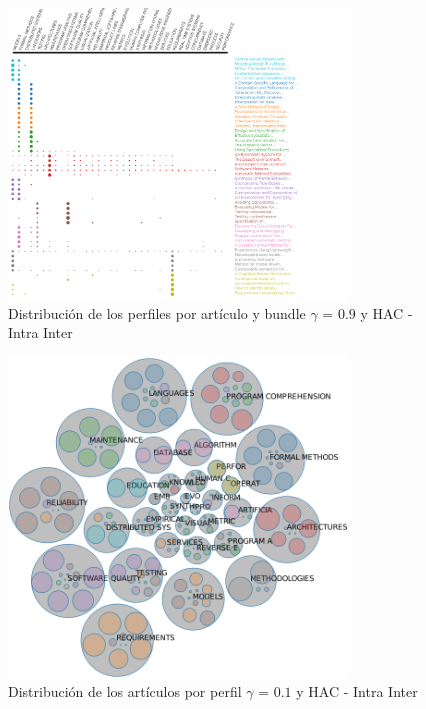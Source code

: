 \begin{figure}[H]
  \centering
    \includegraphics[width=0.8\textwidth]{resultados/papers/HAC/INTRA_INTER/gamma-09.png}
  \caption{Distribución de los perfiles por artículo y bundle $\gamma$ = $0.9$ y HAC - Intra Inter}
  \label{res:img-papers-gamma09-hac-intra-inter}
\end{figure}

\begin{figure}[H]
  \centering
    \includegraphics[width=0.8\textwidth]{resultados/papers/HAC/INTRA_INTER/bubbles-gamma-01.png}
  \caption{Distribución de los artículos por perfil $\gamma$ = $0.1$ y HAC - Intra Inter}
  \label{res:img-papers-bubbles-gamma01-hac-intra-inter}
\end{figure}

